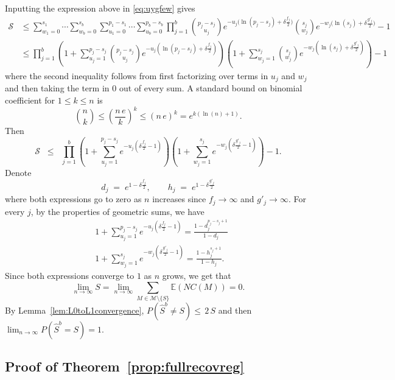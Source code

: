 \documentclass[bj,authoryear]{imsart}
\theoremstyle{plain}
\newcommand{\E}{\mathbb{E}}
\newcommand{\M}{\mathcal{M}}
\begin{document}
Inputting the expression above in \eqref{eq:uygfew} gives
\begin{align*}
    \mathcal{S} 
    &\leq \sum_{w_1=0}^{s_1}\cdots\sum_{w_b=0}^{s_b}\sum_{u_1=0}^{p_1-s_1}\cdots\sum_{u_b=0}^{p_b-s_b}\prod_{j=1}^b {\binom{p_j-s_j}{u_j}}e^{- u_j\big(\ln(p_j-s_j)+\delta \tfrac{f_j}{2}\big)}{\binom{s_j}{w_j}}e^{-w_j\big(\ln(s_j)+\delta \tfrac{g'_j}{2}\big)}-1\\
    &\leq \prod_{j=1}^b\left(1+\sum_{u_j=1}^{p_j-s_j}{\binom{p_j-s_j}{u_j}}e^{- u_j(\ln(p_j-s_j)+\delta \tfrac{f_j}{2})}\right)\left(1+
    \sum_{w_j=1}^{s_j}{\binom{s_j}{w_j}}
    e^{-w_j(\ln(s_j)+\delta \tfrac{g'_j}{2})}\right) - 1
\end{align*}
where the second inequality follows from first factorizing over terms in $u_j$ and $w_j$ and then taking the term in 0 out of every sum. A standard bound on binomial coefficient for $1\leq k\leq n$ is
\begin{equation}\label{eq:upperboudbinom}
    \binom{n}{k} \leq \left(\frac{n\,e}{k}\right)^k \leq \left(n\,e\right)^k = e^{k(\ln(n)+1)}.
\end{equation}
Then
\begin{equation}\label{eq:upperbound_sumprob}
    \mathcal{S} \;\;\leq\;\; \prod_{j=1}^b\left(1+\sum_{u_j=1}^{p_j-s_j}e^{-u_j\left(\delta \tfrac{f_j}{2}-1\right)}\right)\left(1+
    \sum_{w_j=1}^{s_j}    e^{-w_j\left(\delta \tfrac{g'_j}{2}-1\right)}\right) - 1.
\end{equation}
Denote
$$
d_j\;=\;e^{1-\delta \tfrac{f_j}{2}},\qquad h_j\;=\;e^{1-\delta \tfrac{g'_j}{2}}
$$
where both expressions go to zero as $n$ increases since $f_j\to\infty$ and $g'_j\to\infty$.
For every $j$, by the properties of geometric sums, we have
\begin{align*}
    &1+\sum_{u_j=1}^{p_j-s_j}e^{-u_j\left(\delta \tfrac{f_j}{2}-1\right)}
    =\frac{1-d_j^{p_j-s_j+1}}{1-d_j} \\
    &1+\sum_{w_j=1}^{s_j}    e^{-w_j\left(\delta \tfrac{g'_j}{2}-1\right)} =\frac{1-h_j^{s_j+1}}{1-h_j}.
\end{align*}
Since both expressions converge to $1$ as $n$ grows, we get that $$\lim_{n \to \infty} S=\lim_{n \to \infty} \sum_{M \in \M\setminus \{S\}}\E\left(NC(M)\right)= 0.$$ By Lemma~\ref{lem:L0toL1convergence}, $P(\hat S^b\neq S)\leq \,2\, S$ and then $\lim_{n \to \infty} P(\hat S^b= S)=1$.

 \subsection{Proof of Theorem~\ref{prop:fullrecovreg}}
\end{document}
